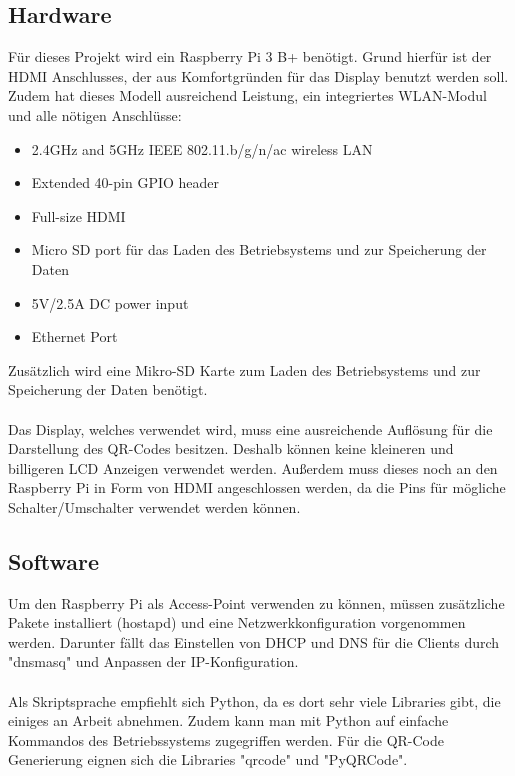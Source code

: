 \documentclass[a4paper,11pt,singlespacing]{article}
\begin{document}
		\subsection{Hardware}
		Für dieses Projekt wird ein Raspberry Pi 3 B+ benötigt. Grund hierfür ist der HDMI Anschlusses, der aus Komfortgründen für das Display benutzt werden soll. Zudem hat dieses Modell ausreichend Leistung, ein integriertes WLAN-Modul und alle nötigen Anschlüsse:
		\begin{itemize}
			\item 2.4GHz and 5GHz IEEE 802.11.b/g/n/ac wireless LAN
			\item Extended 40-pin GPIO header
			\item Full-size HDMI
			\item Micro SD port für das Laden des Betriebsystems und zur Speicherung der Daten
			\item 5V/2.5A DC power input
			\item Ethernet Port
		\end{itemize}
		Zusätzlich wird eine Mikro-SD Karte zum Laden des Betriebsystems und zur Speicherung der Daten benötigt. \\ \\
		Das Display, welches verwendet wird, muss eine ausreichende Auflösung für die Darstellung des QR-Codes besitzen. Deshalb können keine kleineren und billigeren LCD Anzeigen verwendet werden. Außerdem muss dieses noch an den Raspberry Pi in Form von HDMI angeschlossen werden, da die Pins für mögliche Schalter/Umschalter verwendet werden können.
		
		\subsection{Software}
		Um den Raspberry Pi als Access-Point verwenden zu können, müssen zusätzliche Pakete installiert (hostapd) und eine Netzwerkkonfiguration vorgenommen werden. Darunter fällt das Einstellen von DHCP und DNS für die Clients durch "dnsmasq" und Anpassen der IP-Konfiguration. \\ \\
		
		Als Skriptsprache empfiehlt sich Python, da es dort sehr viele Libraries gibt, die einiges an Arbeit abnehmen. Zudem kann man mit Python auf einfache Kommandos des Betriebssystems zugegriffen werden. Für die QR-Code Generierung eignen sich die Libraries "qrcode" und "PyQRCode". 
		
\end{document}
